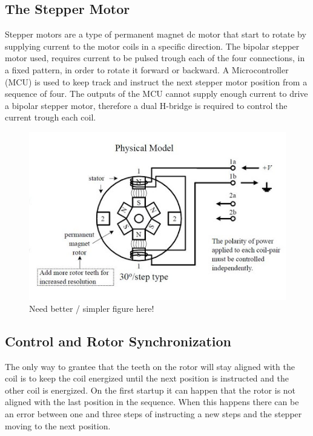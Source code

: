 \subsection{The Stepper Motor}
Stepper motors are a type of permanent magnet dc motor that start to rotate by supplying current to the motor coils in a specific direction.
The bipolar stepper motor used, requires current to be pulsed trough each of the four connections, in a fixed pattern, in order to rotate it forward or backward.
A Microcontroller (MCU) is used to keep track and instruct the next stepper motor position from a sequence of four.
The outputs of the MCU cannot supply enough current to drive a bipolar stepper motor, therefore a dual H-bridge is required to control the current trough each coil.

\begin{figure}
	\centering
	\includegraphics[width=\textwidth]{pics/bipolar_stepper.png}
	\caption{Need better / simpler figure here!}
	\label{fig:bipolarstepper}
\end{figure}

\subsection{Control and Rotor Synchronization}

The only way to grantee that the teeth on the rotor will stay aligned with the coil is to keep the coil energized until the next position is instructed and the other coil is energized. 
On the first startup it can happen that the rotor is not aligned with the last position in the sequence.
When this happens there can be an error between one and three steps of instructing a new steps and the stepper moving to the next position.

